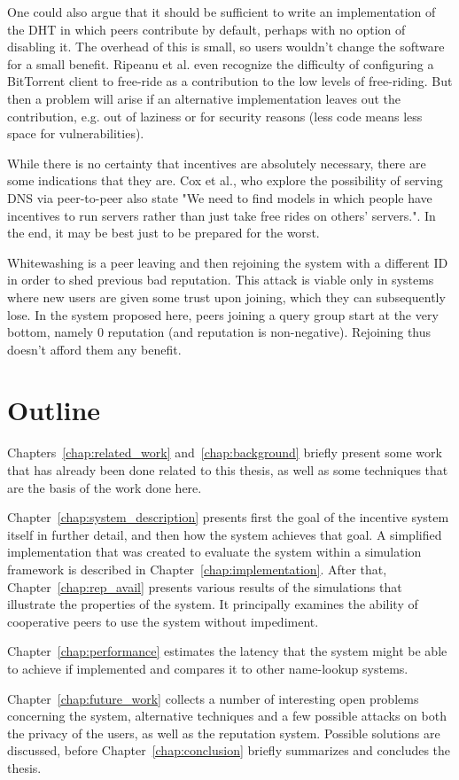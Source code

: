 One could also argue that it should be sufficient to write an implementation of
the \ac{DHT} in which peers contribute by default, perhaps with no option of
disabling it. The overhead of this is small, so users wouldn't change the
software for a small benefit. Ripeanu et al.\cite{ripeanu2006gifting} even
recognize the difficulty of configuring a BitTorrent client to free-ride as a
contribution to the low levels of free-riding. But then a problem will arise if
an alternative implementation leaves out the contribution, e.g. out of laziness
or for security reasons (less code means less space for vulnerabilities).

While there is no certainty that incentives are absolutely necessary, there are
some indications that they are. Cox et al.\cite{cox2002serving}, who explore the
possibility of serving DNS via peer-to-peer also state "We need to find models
in which people have incentives to run servers rather than just take free rides
on others’ servers.". In the end, it may be best just to be prepared for the
worst.

Whitewashing is a peer leaving and then rejoining the system with a different ID
in order to shed previous bad reputation. This attack is viable only in systems
where new users are given some trust upon joining, which they can subsequently
lose. In the system proposed here, peers joining a query group start at the very
bottom, namely 0 reputation (and reputation is non-negative). Rejoining thus
doesn't afford them any benefit.

\section{Outline}
Chapters~\ref{chap:related_work} and~\ref{chap:background} briefly present some
work that has already been done related to this thesis, as well as some
techniques that are the basis of the work done here.

Chapter~\ref{chap:system_description} presents first the goal of the incentive
system itself in further detail, and then how the system achieves that goal. A
simplified implementation that was created to evaluate the system within a
simulation framework is described in Chapter~\ref{chap:implementation}. After
that, Chapter~\ref{chap:rep_avail} presents various results of the simulations
that illustrate the properties of the system. It principally examines the
ability of cooperative peers to use the system without impediment.

Chapter~\ref{chap:performance} estimates the latency that the system might be
able to achieve if implemented and compares it to other name-lookup systems.

Chapter~\ref{chap:future_work} collects a number of interesting open problems
concerning the system, alternative techniques and a few possible attacks on both
the privacy of the users, as well as the reputation system. Possible solutions
are discussed, before Chapter~\ref{chap:conclusion} briefly summarizes and
concludes the thesis.
